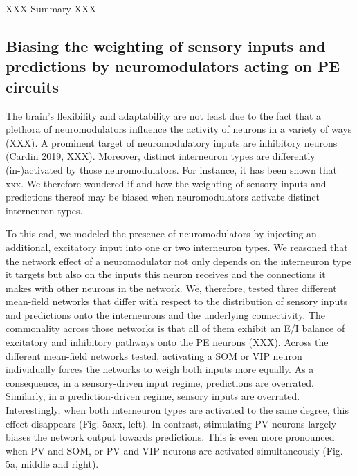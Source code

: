 \documentclass[10pt,a4paper,draft]{article}
\begin{document}
XXX Summary XXX


\subsection*{Biasing the weighting of sensory inputs and predictions by neuromodulators acting on PE circuits}
%
The brain's flexibility and adaptability are not least due to the fact that a plethora of neuromodulators influence the activity of neurons in a variety of ways (XXX). A prominent target of neuromodulatory inputs are inhibitory neurons (Cardin 2019, XXX). Moreover, distinct interneuron types are differently (in-)activated by those neuromodulators. For instance, it has been shown that xxx. We therefore wondered if and how the weighting of sensory inputs and predictions thereof may be biased when neuromodulators activate distinct interneuron types.

To this end, we modeled the presence of neuromodulators by injecting an additional, excitatory input into one or two interneuron types. We reasoned that the network effect of a neuromodulator not only depends on the interneuron type it targets but also on the inputs this neuron receives and the connections it makes with other neurons in the network. We, therefore, tested three different mean-field networks that differ with respect to the distribution of sensory inputs and predictions onto the interneurons and the underlying connectivity. The commonality across those networks is that all of them exhibit an E/I balance of excitatory and inhibitory pathways onto the PE neurons (XXX). Across the different mean-field networks tested, activating a SOM or VIP neuron individually forces the networks to weigh both inputs more equally. As a consequence, in a sensory-driven input regime, predictions are overrated. Similarly, in a prediction-driven regime, sensory inputs are overrated. Interestingly, when both interneuron types are activated to the same degree, this effect disappears (Fig. 5axx, left). In contrast, stimulating PV neurons largely biases the network output towards predictions. This is even more pronounced when PV and SOM, or PV and VIP neurons are activated simultaneously (Fig. 5a, middle and right). 
\end{document}
